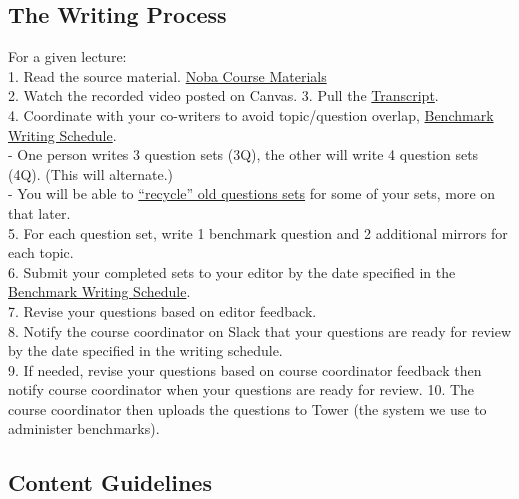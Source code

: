 \documentclass[
]{article}
\begin{document}
\hypertarget{the-writing-process}{%
\subsection{The Writing Process}\label{the-writing-process}}

For a given lecture:\\
1. Read the source material. \href{https://drive.google.com/drive/folders/16iWL0kLyEOdUv9yKJN0-ujgFE7A_gHMH?usp=drive_link}{Noba Course Materials}\\
2. Watch the recorded video posted on Canvas.
3. Pull the \href{https://utexas.app.box.com/folder/301841199745?s=h9lcrvgqmm9zi43g8qo8ctfzcz4yq7wt}{Transcript}.\\
4. Coordinate with your co-writers to avoid topic/question overlap, \href{https://docs.google.com/spreadsheets/d/1N9WRwAjtkOxEvx-edf1KLUiHobvfGxEd/edit?gid=602524248\#gid=602524248}{Benchmark Writing Schedule}.\\
- One person writes 3 question sets (3Q), the other will write 4 question sets (4Q). (This will alternate.)\\
- You will be able to \protect\hyperlink{recycling-benchmark-questions}{``recycle'' old questions sets} for some of your sets, more on that later.\\
5. For each question set, write 1 benchmark question and 2 additional mirrors for each topic.\\
6. Submit your completed sets to your editor by the date specified in the \href{https://docs.google.com/spreadsheets/d/1N9WRwAjtkOxEvx-edf1KLUiHobvfGxEd/edit?gid=602524248\#gid=602524248}{Benchmark Writing Schedule}.\\
7. Revise your questions based on editor feedback.\\
8. Notify the course coordinator on Slack that your questions are ready for review by the date specified in the writing schedule.\\
9. If needed, revise your questions based on course coordinator feedback then notify course coordinator when your questions are ready for review.
10. The course coordinator then uploads the questions to Tower (the system we use to administer benchmarks).

\hypertarget{content-guidelines}{%
\subsection{Content Guidelines}\label{content-guidelines}}
\end{document}
